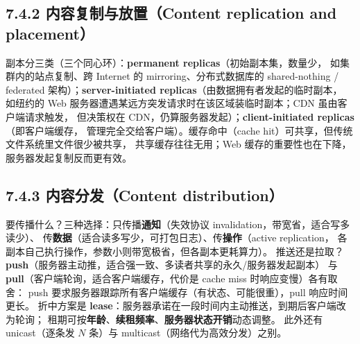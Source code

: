 \begin{closeread}
\end{closeread}


\subsection*{7.4.2 内容复制与放置（Content replication and placement）}
副本分三类（三个同心环）：\textbf{permanent replicas}（初始副本集，数量少，
如集群内的站点复制、跨 Internet 的 mirroring、分布式数据库的 shared-nothing /
federated 架构）；\textbf{server-initiated replicas}（由数据拥有者发起的临时副本，
如纽约的 Web 服务器遭遇某远方突发请求时在该区域装临时副本；CDN 虽由客户端请求触发，
但决策权在 CDN，仍算服务器发起）；\textbf{client-initiated replicas}（即客户端缓存，
管理完全交给客户端）。缓存命中（cache hit）可共享，但传统文件系统里文件很少被共享，
共享缓存往往无用；Web 缓存的重要性也在下降，服务器发起复制反而更有效。

\begin{closeread}
\end{closeread}


\subsection*{7.4.3 内容分发（Content distribution）}
要传播什么？三种选择：只传播\textbf{通知}（失效协议 invalidation，带宽省，适合写多读少）、
传\textbf{数据}（适合读多写少，可打包日志）、传\textbf{操作}（active replication，
各副本自己执行操作，参数小则带宽极省，但各副本更耗算力）。
推送还是拉取？\textbf{push}（服务器主动推，适合强一致、多读者共享的永久/服务器发起副本）
与 \textbf{pull}（客户端轮询，适合客户端缓存，代价是 cache miss 时响应变慢）各有取舍：
push 要求服务器跟踪所有客户端缓存（有状态、可能很重），pull 响应时间更长。
折中方案是 \textbf{lease}：服务器承诺在一段时间内主动推送，到期后客户端改为轮询；
租期可按\textbf{年龄}、\textbf{续租频率}、\textbf{服务器状态开销}动态调整。
此外还有 unicast（逐条发 $N$ 条）与 multicast（网络代为高效分发）之别。

